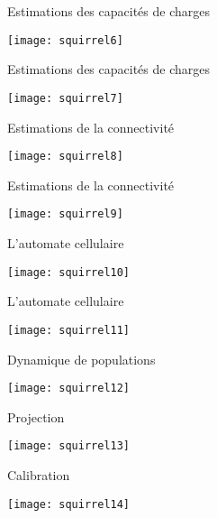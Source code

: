 \documentclass[]{beamer}
\begin{document}
\begin{frame}{Estimations des capacités de charges}
  \begin{center}
    \texttt{[image: squirrel6]}
  \end{center}
\end{frame}

\begin{frame}{Estimations des capacités de charges}
  \begin{center}
    \texttt{[image: squirrel7]}
  \end{center}
\end{frame}


\begin{frame}{Estimations de la connectivité}
  \begin{center}
    \texttt{[image: squirrel8]}
  \end{center}
\end{frame}


\begin{frame}{Estimations de la connectivité}
  \begin{center}
    \texttt{[image: squirrel9]}
  \end{center}
\end{frame}


\begin{frame}{L'automate cellulaire}
  \begin{center}
    \texttt{[image: squirrel10]}
  \end{center}
\end{frame}


\begin{frame}{L'automate cellulaire}
  \begin{center}
    \texttt{[image: squirrel11]}
  \end{center}
\end{frame}


\begin{frame}{Dynamique de populations}
  \begin{center}
    \texttt{[image: squirrel12]}
  \end{center}
\end{frame}


\begin{frame}{Projection}
  \begin{center}
    \texttt{[image: squirrel13]}
  \end{center}
\end{frame}
\begin{frame}{Calibration}
  \begin{center}
    \texttt{[image: squirrel14]}
  \end{center}
\end{frame}
\end{document}

